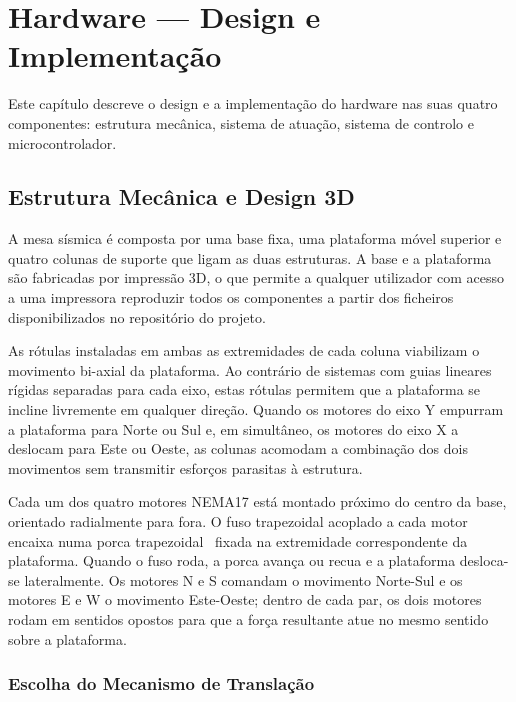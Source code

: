 

\chapter{Hardware --- Design e Implementação}
\label{chapter:hardware}

\begin{introduction}
Este capítulo descreve o design e a implementação do hardware nas suas quatro componentes: estrutura mecânica, sistema de atuação, sistema de controlo e microcontrolador.
\end{introduction}



\section{Estrutura Mecânica e Design 3D}
\label{sec:estrutura-mecanica}

A mesa sísmica é composta por uma base fixa, uma plataforma móvel superior e quatro colunas de suporte que ligam as duas estruturas. A base e a plataforma são fabricadas por impressão 3D, o que permite a qualquer utilizador com acesso a uma impressora reproduzir todos os componentes a partir dos ficheiros disponibilizados no repositório do projeto.

As rótulas instaladas em ambas as extremidades de cada coluna viabilizam o movimento bi-axial da plataforma. Ao contrário de sistemas com guias lineares rígidas separadas para cada eixo, estas rótulas permitem que a plataforma se incline livremente em qualquer direção. Quando os motores do eixo Y empurram a plataforma para Norte ou Sul e, em simultâneo, os motores do eixo X a deslocam para Este ou Oeste, as colunas acomodam a combinação dos dois movimentos sem transmitir esforços parasitas à estrutura.

Cada um dos quatro motores NEMA17 está montado próximo do centro da base, orientado radialmente para fora. O fuso trapezoidal acoplado a cada motor encaixa numa porca trapezoidal~\cite{Fillment3DPorca} fixada na extremidade correspondente da plataforma. Quando o fuso roda, a porca avança ou recua e a plataforma desloca-se lateralmente. Os motores N e S comandam o movimento Norte-Sul e os motores E e W o movimento Este-Oeste; dentro de cada par, os dois motores rodam em sentidos opostos para que a força resultante atue no mesmo sentido sobre a plataforma.


\subsection{Escolha do Mecanismo de Translação}
\label{subsec:mecanismo-translacao}

